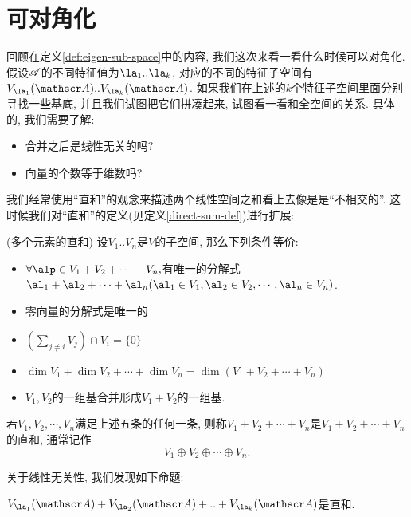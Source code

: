 \section{可对角化}

回顾在定义\ref{def:eigen-sub-space}中的内容, 我们这次来看一看什么时候可以对角化. 假设$\mathscr{A}$的不同特征值为$\la_{1}..\la_{k}$,
对应的不同的特征子空间有$V_{\la_{1}}(\huaa)..V_{\la_{k}}(\huaa)$. 如果我们在上述的$k$个特征子空间里面分别寻找一些基底,
并且我们试图把它们拼凑起来, 试图看一看和全空间的关系. 具体的, 我们需要了解:
\begin{itemize}
\item 合并之后是线性无关的吗?
\item 向量的个数等于维数吗?
\end{itemize}
我们经常使用``直和''的观念来描述两个线性空间之和看上去像是是``不相交的''. 这时候我们对``直和''的定义(见定义\ref{direct-sum-def})进行扩展: 
\begin{defn}
(多个元素的直和) 设$V_{1}..V_{n}$是$V$的子空间, 那么下列条件等价:
\begin{itemize}
\item $\forall\alp\in V_{1}+V_{2}+\cdots+V_{n},$有唯一的分解式$\al_{1}+\al_{2}+\cdots+\al_{n}(\al_{1}\in V_{1},\al_{2}\in V_{2},\cdots,\al_{n}\in V_{n})$.
\item 零向量的分解式是唯一的
\item $\left(\sum_{j\neq i}V_{j}\right)\cap V_{i}=\{0\}$
\item $\dim V_{1}+\dim V_{2}+\cdots+\dim V_{n}=\dim\left(V_{1}+V_{2}+\cdots+V_{n}\right)$
\item $V_{1},V_{2}$的一组基合并形成$V_{1}+V_{2}$的一组基. 
\end{itemize}
若$V_{1},V_{2},\cdots,V_{n}$满足上述五条的任何一条, 则称$V_{1}+V_{2}+\cdots+V_{n}$是$V_{1}+V_{2}+\cdots+V_{n}$的直和,
通常记作
\[
V_{1}\oplus V_{2}\oplus\cdots\oplus V_{n}.
\]

\end{defn}
关于线性无关性, 我们发现如下命题: 
\begin{prop}
$V_{\la_{1}}(\huaa)+V_{\la_{2}}(\huaa)+..+V_{\la_{k}}(\huaa)$是直和. 
\end{prop}

